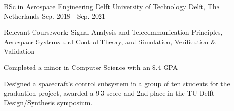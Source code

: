   \cventry
    {BSc in Aerospace Engineering} %
    {Delft University of Technology} %
    {Delft, The Netherlands} %
    {Sep. 2018 - Sep. 2021} %
    {
      \begin{cvitems} %
        \item {Relevant Coursework: Signal Analysis and Telecommunication Principles, Aerospace Systems and Control Theory, and Simulation, Verification \& Validation}
        \item {Completed a minor in Computer Science with an 8.4 GPA}
        \item {Designed a spacecraft’s control subsystem in a group of ten students for the graduation project, awarded a 9.3 score and 2nd place in the TU Delft Design/Synthesis symposium.}
      \end{cvitems}
    }

